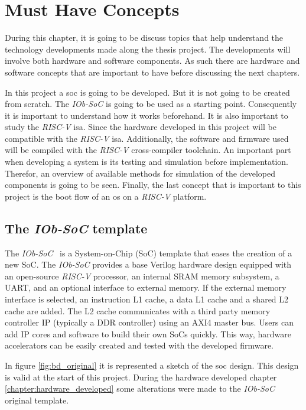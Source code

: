 \chapter{Must Have Concepts}
\label{chapter:must_have_concepts}
During this chapter, it is going to be discuss topics that help understand the technology developments made along the thesis project. The developments will involve both hardware and software components. As such there are hardware and software concepts that are important to have before discussing the next chapters.

In this project a \acrshort{soc} is going to be developed. But it is not going to be created from scratch. The \textit{IOb-SoC} is going to be used as a starting point. Consequently it is important to understand how it works beforehand. It is also important to study the \textit{RISC-V} \acrfull{isa}. Since the hardware developed in this project will be compatible with the \textit{RISC-V} \acrshort{isa}. Additionally, the software and firmware used will be compiled with the \textit{RISC-V} cross-compiler toolchain. An important part when developing a system is its testing and simulation before implementation. Therefor, an overview of available methods for simulation of the developed components is going to be seen. Finally, the last concept that is important to this project is the boot flow of an \acrfull{os} on a \textit{RISC-V} platform.

\section{The \textit{IOb-SoC} template}
\label{section:the_iob_soc_template}
The \textit{IOb-SoC}~\cite{iob_soc_repo} is a System-on-Chip (SoC) template that eases the creation of a new SoC. The \textit{IOb-SoC} provides a base Verilog hardware design equipped with an open-source \textit{RISC-V} processor, an internal SRAM memory subsystem, a UART, and an optional interface to external memory. If the external memory interface is selected, an instruction L1 cache, a data L1 cache and a shared L2 cache are added. The L2 cache communicates with a third party memory controller IP (typically a DDR controller) using an AXI4 master bus. Users can add IP cores and software to build their own SoCs quickly. This way, hardware accelerators can be easily created and tested with the developed firmware.

In figure \ref{fig:bd_original} it is represented a sketch of the \acrshort{soc} design. This design is valid at the start of this project. During the hardware developed chapter \ref{chapter:hardware_developed} some alterations were made to the \textit{IOb-SoC} original template.


